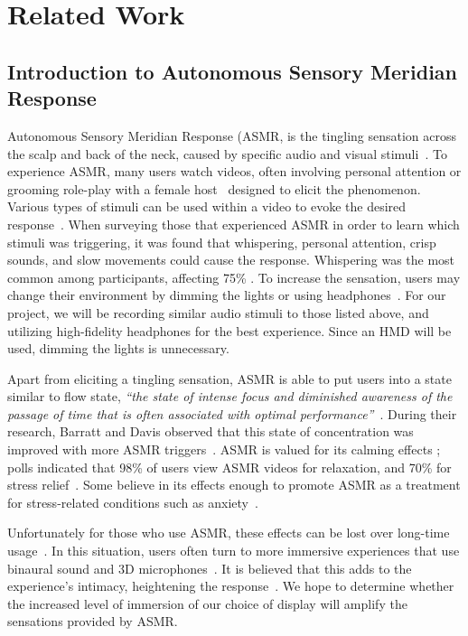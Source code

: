 \documentclass{sigchi}
\newcommand{\inlinequote}[1]{\textit{``#1''}}
\begin{document}
\section{Related Work}

\subsection{Introduction to Autonomous Sensory Meridian Response}
Autonomous Sensory Meridian Response (ASMR, is the tingling sensation across the scalp and back of the neck, caused by specific audio and visual stimuli~\cite{barratt2015autonomous}. To experience ASMR, many users watch videos, often involving personal attention or grooming role-play \cite{andersen2015now,barratt2015autonomous} with a female host~\cite{andersen2015now} designed to elicit the phenomenon. Various types of stimuli can be used within a video to evoke the desired response~\cite{barratt2015autonomous}. When surveying those that experienced ASMR in order to learn which stimuli was triggering, it was found that whispering, personal attention, crisp sounds, and slow movements could cause the response. Whispering was the most common among participants, affecting 75\% \cite{barratt2015autonomous}. To increase the sensation, users may change their environment by dimming the lights or using headphones~\cite{begman2015}. For our project, we will be recording similar audio stimuli to those listed above, and utilizing high-fidelity headphones for the best experience. Since an HMD will be used, dimming the lights is unnecessary.

Apart from eliciting a tingling sensation, ASMR is able to put users into a state similar to flow state, \inlinequote{the state of intense focus and diminished awareness of the passage of time that is often associated with optimal performance}~\cite{barratt2015autonomous}. During their research, Barratt and Davis observed that this state of concentration was improved with more ASMR triggers~\cite{barratt2015autonomous}. ASMR is valued for its calming effects \cite{barratt2015autonomous}; polls indicated that 98\% of users view ASMR videos for relaxation, and 70\% for stress relief~\cite{barratt2015autonomous}. Some believe in its effects enough to promote ASMR as a treatment for stress-related conditions such as anxiety~\cite{andersen2015now,begman2015}.

Unfortunately for those who use ASMR, these effects can be lost over long-time usage~\cite{andersen2015now}. In this situation, users often turn to more immersive experiences that use binaural sound and 3D microphones~\cite{andersen2015now}. It is believed that this adds to the experience's intimacy, heightening the response~\cite{andersen2015now}. We hope to determine whether the increased level of immersion of our choice of display will amplify the sensations provided by ASMR.
\end{document}
